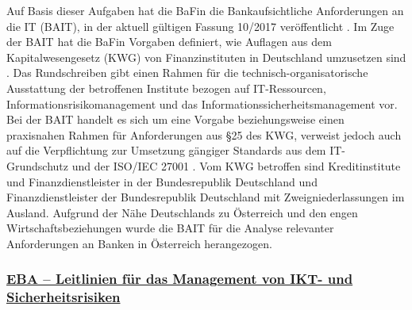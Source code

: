 Auf Basis dieser Aufgaben hat die BaFin die \glqq{}Bankaufsichtliche Anforderungen an die IT\grqq{} (BAIT), in der aktuell gültigen Fassung \glqq{}10/2017\grqq{} veröffentlicht \autocite{bafin_rundschreiben}. Im Zuge der BAIT hat die BaFin Vorgaben definiert, wie Auflagen aus dem Kapitalwesengesetz (KWG) von Finanzinstituten in Deutschland umzusetzen sind \autocite{kwg_gesetze}. Das Rundschreiben gibt einen Rahmen für die technisch-organisatorische Ausstattung der betroffenen Institute bezogen auf IT-Ressourcen, Informationsrisikomanagement und das Informationssicherheitsmanagement vor. Bei der BAIT handelt es sich um eine Vorgabe beziehungsweise einen praxisnahen Rahmen für Anforderungen aus §25 des KWG, verweist jedoch auch auf die Verpflichtung zur Umsetzung gängiger Standards aus dem IT-Grundschutz und der ISO/IEC 27001 \autocite{BSI_informationstechnik_2021} \autocite{tuev_austria_2022} \autocite{DieBafin}.
\bigbreak
Vom KWG betroffen sind Kreditinstitute und Finanzdienstleister in der Bundesrepublik Deutschland und Finanzdienstleister der Bundesrepublik Deutschland mit Zweigniederlassungen im Ausland. Aufgrund der Nähe Deutschlands zu Österreich und den engen Wirtschaftsbeziehungen wurde die BAIT für die Analyse relevanter Anforderungen an Banken in Österreich herangezogen. \autocite{MaRisk}


\subsubsection{\underline{EBA – Leitlinien für das Management von IKT- und Sicherheitsrisiken}}

